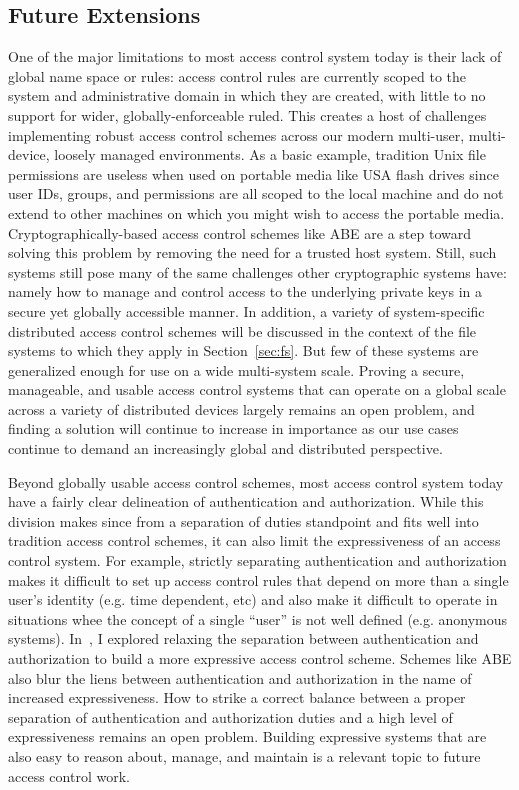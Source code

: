 \documentclass{sig-alternate}
\begin{document}
\subsection{Future Extensions}

One of the major limitations to most access control system today is
their lack of global name space or rules: access control rules are
currently scoped to the system and administrative domain in which they
are created, with little to no support for wider, globally-enforceable
ruled. This creates a host of challenges implementing robust access
control schemes across our modern multi-user, multi-device, loosely
managed environments. As a basic example, tradition Unix file
permissions are useless when used on portable media like USA flash
drives since user IDs, groups, and permissions are all scoped to the
local machine and do not extend to other machines on which you might
wish to access the portable media. Cryptographically-based access
control schemes like ABE are a step toward solving this problem by
removing the need for a trusted host system. Still, such systems still
pose many of the same challenges other cryptographic systems have:
namely how to manage and control access to the underlying private keys
in a secure yet globally accessible manner. In addition, a variety of
system-specific distributed access control schemes will be discussed
in the context of the file systems to which they apply in
Section~\ref{sec:fs}. But few of these systems are generalized enough
for use on a wide multi-system scale. Proving a secure, manageable,
and usable access control systems that can operate on a global scale
across a variety of distributed devices largely remains an open
problem, and finding a solution will continue to increase in
importance as our use cases continue to demand an increasingly global
and distributed perspective.

Beyond globally usable access control schemes, most access control
system today have a fairly clear delineation of authentication and
authorization. While this division makes since from a separation of
duties standpoint and fits well into tradition access control schemes,
it can also limit the expressiveness of an access control system. For
example, strictly separating authentication and authorization makes it
difficult to set up access control rules that depend on more than a
single user's identity (e.g. time dependent, etc) and also make it
difficult to operate in situations whee the concept of a single
``user'' is not well defined (e.g. anonymous
systems). In~\cite{custos-masters}, I explored relaxing the separation
between authentication and authorization to build a more expressive
access control scheme. Schemes like ABE also blur the liens between
authentication and authorization in the name of increased
expressiveness. How to strike a correct balance between a proper
separation of authentication and authorization duties and a high level
of expressiveness remains an open problem. Building expressive systems
that are also easy to reason about, manage, and maintain is a relevant
topic to future access control work.
\end{document}
